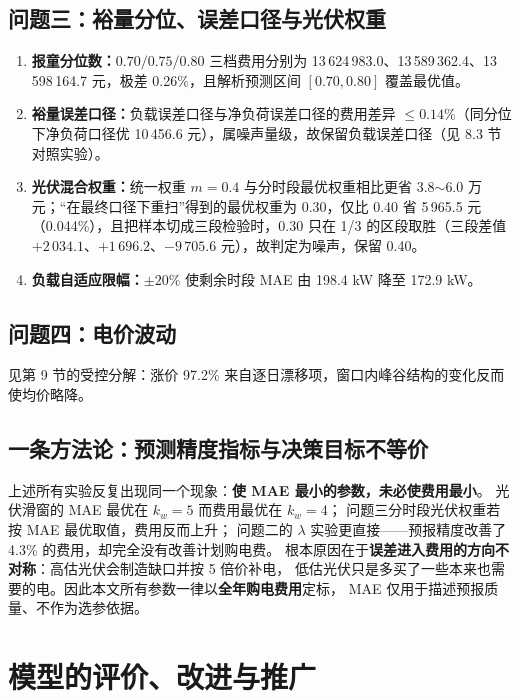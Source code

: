 \documentclass{cumcmthesis}
\begin{document}
\subsection{问题三：裕量分位、误差口径与光伏权重}
\begin{enumerate}
    \item \textbf{报童分位数：}$0.70/0.75/0.80$ 三档费用分别为 13\,624\,983.0、13\,589\,362.4、13\,598\,164.7 元，极差 0.26\%，且解析预测区间 $[0.70,0.80]$ 覆盖最优值。
    \item \textbf{裕量误差口径：}负载误差口径与净负荷误差口径的费用差异 $\le0.14\%$（同分位下净负荷口径优 10\,456.6 元），属噪声量级，故保留负载误差口径（见 8.3 节对照实验）。
    \item \textbf{光伏混合权重：}统一权重 $m=0.4$ 与分时段最优权重相比更省 3.8$\sim$6.0 万元；“在最终口径下重扫”得到的最优权重为 0.30，仅比 0.40 省 5\,965.5 元（0.044\%），且把样本切成三段检验时，0.30 只在 1/3 的区段取胜（三段差值 $+2\,034.1$、$+1\,696.2$、$-9\,705.6$ 元），故判定为噪声，保留 0.40。
    \item \textbf{负载自适应限幅：}$\pm20\%$ 使剩余时段 MAE 由 198.4 kW 降至 172.9 kW。
\end{enumerate}

\subsection{问题四：电价波动}
见第 9 节的受控分解：涨价 97.2\% 来自逐日漂移项，窗口内峰谷结构的变化反而使均价略降。

\subsection{一条方法论：预测精度指标与决策目标不等价}
上述所有实验反复出现同一个现象：\textbf{使 MAE 最小的参数，未必使费用最小}。
光伏滑窗的 MAE 最优在 $k_w=5$ 而费用最优在 $k_w=4$；
问题三分时段光伏权重若按 MAE 最优取值，费用反而上升；
问题二的 $\lambda$ 实验更直接——预报精度改善了 4.3\% 的费用，却完全没有改善计划购电费。
根本原因在于\textbf{误差进入费用的方向不对称}：高估光伏会制造缺口并按 5 倍价补电，
低估光伏只是多买了一些本来也需要的电。因此本文所有参数一律以\textbf{全年购电费用}定标，
MAE 仅用于描述预报质量、不作为选参依据。

\section{模型的评价、改进与推广}
\end{document}
